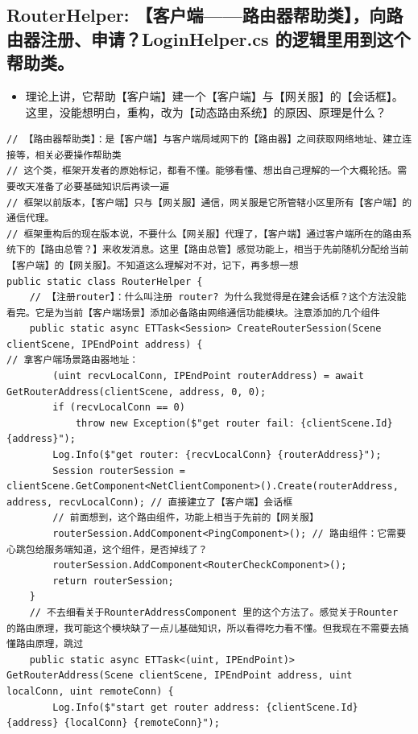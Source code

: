 \documentclass[9pt, b5paper]{article}
\begin{document}
\subsection{RouterHelper: 【客户端——路由器帮助类】，向路由器注册、申请？LoginHelper.cs 的逻辑里用到这个帮助类。}
\label{sec-7-15}
\begin{itemize}
\item 理论上讲，它帮助【客户端】建一个【客户端】与【网关服】的【会话框】。这里，没能想明白，重构，改为【动态路由系统】的原因、原理是什么？
\end{itemize}
\begin{verbatim}
// 【路由器帮助类】：是【客户端】与客户端局域网下的【路由器】之间获取网络地址、建立连接等，相关必要操作帮助类
// 这个类，框架开发者的原始标记，都看不懂。能够看懂、想出自己理解的一个大概轮括。需要改天准备了必要基础知识后再读一遍
// 框架以前版本，【客户端】只与【网关服】通信，网关服是它所管辖小区里所有【客户端】的通信代理。
// 框架重构后的现在版本说，不要什么【网关服】代理了，【客户端】通过客户端所在的路由系统下的【路由总管？】来收发消息。这里【路由总管】感觉功能上，相当于先前随机分配给当前【客户端】的【网关服】。不知道这么理解对不对，记下，再多想一想
public static class RouterHelper {
    // 【注册router】：什么叫注册 router? 为什么我觉得是在建会话框？这个方法没能看完。它是为当前【客户端场景】添加必备路由网络通信功能模块。注意添加的几个组件
    public static async ETTask<Session> CreateRouterSession(Scene clientScene, IPEndPoint address) {
// 拿客户端场景路由器地址：
        (uint recvLocalConn, IPEndPoint routerAddress) = await GetRouterAddress(clientScene, address, 0, 0); 
        if (recvLocalConn == 0) 
            throw new Exception($"get router fail: {clientScene.Id} {address}");
        Log.Info($"get router: {recvLocalConn} {routerAddress}");
        Session routerSession = clientScene.GetComponent<NetClientComponent>().Create(routerAddress, address, recvLocalConn); // 直接建立了【客户端】会话框
        // 前面想到，这个路由组件，功能上相当于先前的【网关服】
        routerSession.AddComponent<PingComponent>(); // 路由组件：它需要心跳包给服务端知道，这个组件，是否掉线了？
        routerSession.AddComponent<RouterCheckComponent>(); 
        return routerSession;
    }
    // 不去细看关于RounterAddressComponent 里的这个方法了。感觉关于Rounter 的路由原理，我可能这个模块缺了一点儿基础知识，所以看得吃力看不懂。但我现在不需要去搞懂路由原理，跳过
    public static async ETTask<(uint, IPEndPoint)> GetRouterAddress(Scene clientScene, IPEndPoint address, uint localConn, uint remoteConn) {
        Log.Info($"start get router address: {clientScene.Id} {address} {localConn} {remoteConn}");

\end{verbatim}
\end{document}
